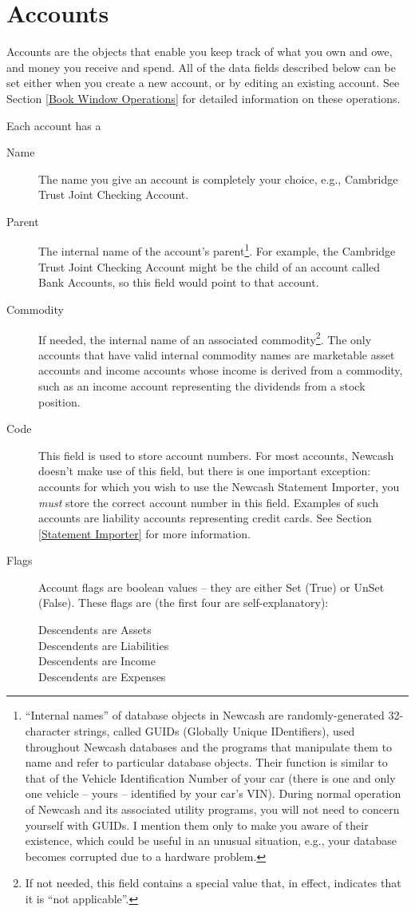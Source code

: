 \documentclass{report}
\begin{document}
\section{Accounts}
Accounts are the objects that enable you keep track of what you own and owe, and money you receive and spend. All of the data fields described below can be set either when you create a new account, or by editing an existing account. See Section \ref{Book Window Operations} for detailed information on these operations.

Each account has a
\begin{description}
\item [Name] The name you give an account is completely your choice, e.g., Cambridge Trust Joint Checking Account.
\item [Parent] The internal name of the account's parent\footnote{``Internal names'' of database objects in Newcash are randomly-generated 32-character strings, called GUIDs (Globally Unique IDentifiers), used throughout Newcash databases and the programs that manipulate them to name and refer to particular database objects. Their function is similar to that of the Vehicle Identification Number of your car (there is one and only one vehicle -- yours -- identified by your car's VIN).  During normal operation of Newcash and its associated utility programs, you will not need to concern yourself with GUIDs. I mention them only to make you aware of their existence, which could be useful in an unusual situation, e.g., your database becomes corrupted due to a hardware problem.}. For example, the Cambridge Trust Joint Checking Account might be the child of an account called Bank Accounts, so this field would point to that account.
\item [Commodity] If needed, the internal name of an associated commodity\footnote{If not needed, this field contains a special value that, in effect, indicates that it is ``not applicable''.}. The only accounts that have valid internal commodity names are marketable asset accounts and income accounts whose income is derived from a commodity, such as an income account representing the dividends from a stock position.
\item [Code] This field is used to store account numbers. For most accounts, Newcash doesn't make use of this field, but there is one important exception: accounts for which you wish to use the Newcash Statement Importer, you \emph{must} store the correct account number in this field. Examples of such accounts are liability accounts representing credit cards. See Section \ref{Statement Importer} for more information.
\item [Flags] Account flags are boolean values -- they are either Set (True) or UnSet (False). These flags are (the first four are self-explanatory):
\begin{description}
\item [Descendents are Assets]
\item [Descendents are Liabilities]
\item [Descendents are Income]
\item [Descendents are Expenses]


\end{description}
\end{description}
\end{document}

